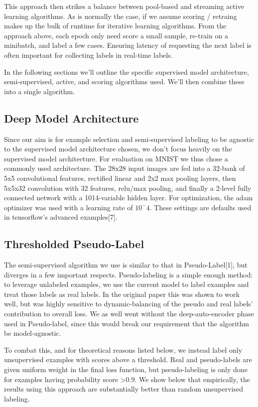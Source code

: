 \documentclass{article}
\begin{document}
This approach then strikes a balance between pool-based and streaming active learning algorithms.  As is normally the case, if we assume scoring / retraing makes up the bulk of runtime for iterative learning algorithms.  From the approach above, each epoch only need score a small sample, re-train on a minibatch, and label a few cases.  Ensuring latency of requesting the next label is often important for collecting labels in real-time labels.  

In the following sections we'll outline the specific supervised model architecture, semi-supervised, active, and scoring algorithms used.  We'll then combine these into a single algorithm.  

\subsection{Deep Model Architecture}
Since our aim is for example selection and semi-supervised labeling to be agnostic to the supervised model architecture chosen, we don't focus heavily on the supervised model architecture.  For evaluation on MNIST we thus chose a commonly used architecture.  The 28x28 input images are fed into a 32-bank of 5x5 convolutional features, rectified linear and 2x2 max pooling layers, then 5x5x32 convolution with 32 features, relu/max pooling, and finally a 2-level fully connected network with a 1014-variable hidden layer.  For optimization, the adam optimizer was used with a learning rate of $10^-4$.  These settings are defaults used in tensorflow's advanced examples[7].

\subsection{Thresholded Pseudo-Label}
The semi-supervised algorithm we use is similar to that in Pseudo-Label[1], but diverges in a few important respects.  Pseudo-labeling is a simple enough method: to leverage unlabeled examples, we use the current model to label examples and treat those labels as real labels.  In the original paper this was shown to work well, but was highly sensitive to dynamic-balancing of the pseudo and real labels' contribution to overall loss.  We as well went without the deep-auto-encoder phase used in Pseudo-label, since this would break our requirement that the algorithm be model-agnostic.  

To combat this, and for theoretical reasons listed below, we instead label only unsupervised examples with scores above a threshold.  Real and pseudo-labels are given uniform weight in the final loss function, but pseudo-labeling is only done for examples having probability score >0.9.  We show below that empirically, the results using this approach are substantially better than random unsupervised labeling.  
\end{document}
